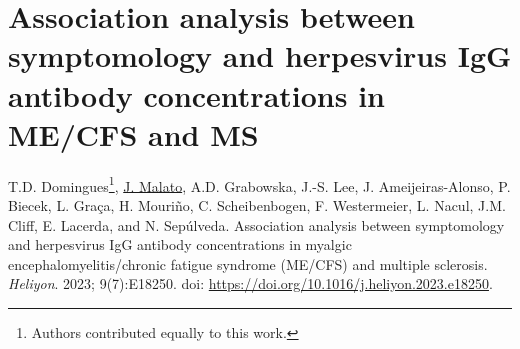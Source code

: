 \chapter{Association analysis between symptomology and herpesvirus IgG antibody concentrations in ME/CFS and MS}
\label{chapter:2023-sym-and-herpesvirus}

\noindent T.D. Domingues\footnote{\label{foot:contribution}Authors contributed equally to this work.}, \underline{J. Malato}, A.D. Grabowska, J.-S. Lee, J. Ameijeiras-Alonso, P. Biecek, L. Graça, H. Mouriño, C. Scheibenbogen, F. Westermeier, L. Nacul, J.M. Cliff, E. Lacerda, and N. Sepúlveda. Association analysis between symptomology and herpesvirus IgG antibody concentrations in myalgic encephalomyelitis/chronic fatigue syndrome (ME/CFS) and multiple sclerosis. \textit{Heliyon}. 2023; 9(7):E18250. doi: \url{https://doi.org/10.1016/j.heliyon.2023.e18250}.


